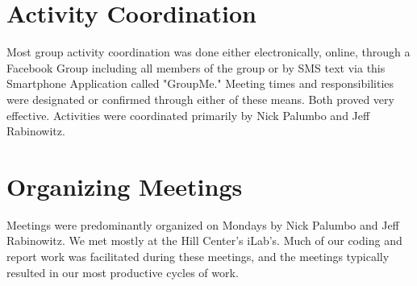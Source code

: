 \section{Activity Coordination}

Most group activity coordination was done either electronically, online, through a Facebook Group including all members of the group or by SMS text via this Smartphone Application called "GroupMe." Meeting times and responsibilities were designated or confirmed through either of these means. Both proved very effective. Activities were coordinated primarily by
Nick Palumbo and Jeff Rabinowitz.

\section{Organizing Meetings}

Meetings were predominantly organized on Mondays by Nick Palumbo and Jeff Rabinowitz. We met mostly at the Hill Center's iLab's. Much of our coding and report work was facilitated during these meetings, and the meetings typically resulted in our most productive cycles of work.